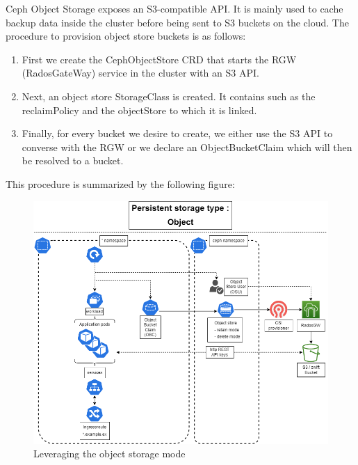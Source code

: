 \hspace{7mm}Ceph Object Storage exposes an S3-compatible API. It is mainly used to cache backup data inside the cluster before being sent to S3 buckets on the cloud. The procedure to provision object store buckets is as follows: 

\begin{enumerate}[label = (\arabic*)]
    \item First we create the CephObjectStore CRD that starts the RGW (RadosGateWay) service in the cluster with an S3 API. 
    \item Next, an object store StorageClass is created. It contains such as the reclaimPolicy and the objectStore to which it is linked. 
    \item Finally, for every bucket we desire to create, we either use the S3 API to converse with the RGW or we declare an ObjectBucketClaim which will then be resolved to a bucket. 
\end{enumerate}


\hspace{7mm}This procedure is summarized by the following figure: 

\begin{figure}[H]\centering
\includegraphics[width=1.0\textwidth,angle=00]{assets/f32.png}
\caption{Leveraging the object storage mode }
\label{fig:Object Storage mode}
\end{figure}

\newpage



